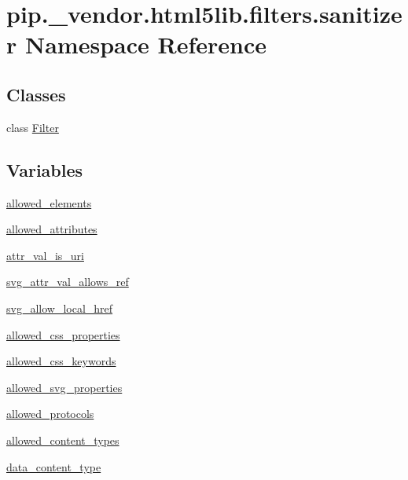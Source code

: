 \hypertarget{namespacepip_1_1__vendor_1_1html5lib_1_1filters_1_1sanitizer}{}\section{pip.\+\_\+vendor.\+html5lib.\+filters.\+sanitizer Namespace Reference}
\label{namespacepip_1_1__vendor_1_1html5lib_1_1filters_1_1sanitizer}
\subsection*{Classes}
\begin{DoxyCompactItemize}
\item 
class \hyperlink{classpip_1_1__vendor_1_1html5lib_1_1filters_1_1sanitizer_1_1Filter}{Filter}
\end{DoxyCompactItemize}
\subsection*{Variables}
\begin{DoxyCompactItemize}
\item 
\hyperlink{namespacepip_1_1__vendor_1_1html5lib_1_1filters_1_1sanitizer_aa58bff8bfcbddafd1d0bfa266feef490}{allowed\+\_\+elements}
\item 
\hyperlink{namespacepip_1_1__vendor_1_1html5lib_1_1filters_1_1sanitizer_ae8cc71330769e175904116bb611f5115}{allowed\+\_\+attributes}
\item 
\hyperlink{namespacepip_1_1__vendor_1_1html5lib_1_1filters_1_1sanitizer_a7ae4c520dce92d95b7ccebfb3f09e702}{attr\+\_\+val\+\_\+is\+\_\+uri}
\item 
\hyperlink{namespacepip_1_1__vendor_1_1html5lib_1_1filters_1_1sanitizer_acdfd65fd382af74d1b16310fc06b4197}{svg\+\_\+attr\+\_\+val\+\_\+allows\+\_\+ref}
\item 
\hyperlink{namespacepip_1_1__vendor_1_1html5lib_1_1filters_1_1sanitizer_a69f2b5ddd4e92b7287abe3240e3d6106}{svg\+\_\+allow\+\_\+local\+\_\+href}
\item 
\hyperlink{namespacepip_1_1__vendor_1_1html5lib_1_1filters_1_1sanitizer_a4493cd118c2d260c0721a15ac5b03c5a}{allowed\+\_\+css\+\_\+properties}
\item 
\hyperlink{namespacepip_1_1__vendor_1_1html5lib_1_1filters_1_1sanitizer_a19f3af8f7fe22a9648f9e18a001c4a96}{allowed\+\_\+css\+\_\+keywords}
\item 
\hyperlink{namespacepip_1_1__vendor_1_1html5lib_1_1filters_1_1sanitizer_a40fa5b411c39f67a70b16855a8547915}{allowed\+\_\+svg\+\_\+properties}
\item 
\hyperlink{namespacepip_1_1__vendor_1_1html5lib_1_1filters_1_1sanitizer_a17d9c29b4492aa4d370fea119963fc92}{allowed\+\_\+protocols}
\item 
\hyperlink{namespacepip_1_1__vendor_1_1html5lib_1_1filters_1_1sanitizer_a00766c11c6d86b8590de0e53853f7036}{allowed\+\_\+content\+\_\+types}
\item 
\hyperlink{namespacepip_1_1__vendor_1_1html5lib_1_1filters_1_1sanitizer_a43747776c6af6d143e76399d804ec78d}{data\+\_\+content\+\_\+type}
\end{DoxyCompactItemize}


